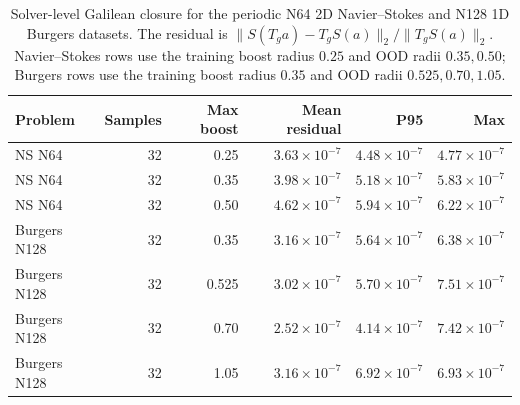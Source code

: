 \begin{table}[t]
\centering
\small
\caption{Solver-level Galilean closure for the periodic N64 2D Navier--Stokes and N128 1D Burgers datasets. The residual is \(\|S(T_g a)-T_gS(a)\|_2/\|T_gS(a)\|_2\). Navier--Stokes rows use the training boost radius \(0.25\) and OOD radii \(0.35,0.50\); Burgers rows use the training boost radius \(0.35\) and OOD radii \(0.525,0.70,1.05\).}
\label{tab:galilean-solver-closure}
\begin{tabular}{lrrrrr}
\toprule
Problem & Samples & Max boost & Mean residual & P95 & Max \\
\midrule
NS N64 & 32 & 0.25 & \(3.63\times10^{-7}\) & \(4.48\times10^{-7}\) & \(4.77\times10^{-7}\) \\
NS N64 & 32 & 0.35 & \(3.98\times10^{-7}\) & \(5.18\times10^{-7}\) & \(5.83\times10^{-7}\) \\
NS N64 & 32 & 0.50 & \(4.62\times10^{-7}\) & \(5.94\times10^{-7}\) & \(6.22\times10^{-7}\) \\
Burgers N128 & 32 & 0.35 & \(3.16\times10^{-7}\) & \(5.64\times10^{-7}\) & \(6.38\times10^{-7}\) \\
Burgers N128 & 32 & 0.525 & \(3.02\times10^{-7}\) & \(5.70\times10^{-7}\) & \(7.51\times10^{-7}\) \\
Burgers N128 & 32 & 0.70 & \(2.52\times10^{-7}\) & \(4.14\times10^{-7}\) & \(7.42\times10^{-7}\) \\
Burgers N128 & 32 & 1.05 & \(3.16\times10^{-7}\) & \(6.92\times10^{-7}\) & \(6.93\times10^{-7}\) \\
\bottomrule
\end{tabular}
\end{table}
